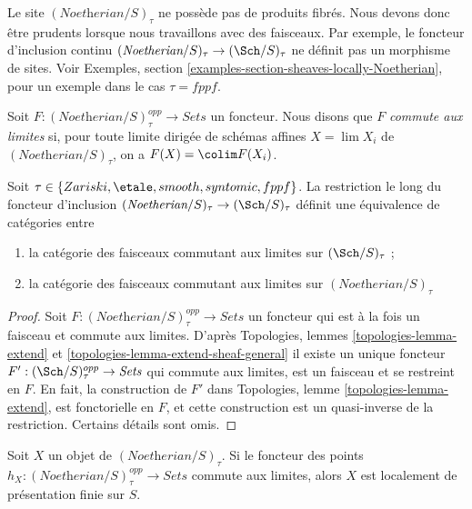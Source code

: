 \begin{remark}[Avertissement]
\label{remark-no-fibre-products}
Le site $(\textit{Noetherian}/S)_\tau$ ne possède pas de produits fibrés.
Nous devons donc être prudents lorsque nous travaillons avec des faisceaux.
Par exemple, le foncteur d'inclusion continu
$(\textit{Noetherian}/S)_\tau \to (\Sch/S)_\tau$
ne définit pas un morphisme de sites. Voir Exemples, section
\ref{examples-section-sheaves-locally-Noetherian}, pour un exemple dans le cas
$\tau = fppf$.
\end{remark}

\noindent
Soit $F : (\textit{Noetherian}/S)_\tau^{opp} \to \textit{Sets}$ un foncteur.
Nous disons que $F$ {\it commute aux limites} si, pour toute limite dirigée de
schémas affines $X = \lim X_i$ de $(\textit{Noetherian}/S)_\tau$, on a
$F(X) = \colim F(X_i)$.

\begin{lemma}
\label{lemma-canonical-extension}
Soit $\tau \in \{Zariski, \etale, smooth, syntomic, fppf\}$. La restriction le
long du foncteur d'inclusion
$(\textit{Noetherian}/S)_\tau \to (\Sch/S)_\tau$
définit une équivalence de catégories entre
\begin{enumerate}
\item la catégorie des faisceaux commutant aux limites sur
$(\Sch/S)_\tau$ ;
\item la catégorie des faisceaux commutant aux limites sur
$(\textit{Noetherian}/S)_\tau$
\end{enumerate}
\end{lemma}

\begin{proof}
Soit $F : (\textit{Noetherian}/S)_\tau^{opp} \to \textit{Sets}$ un foncteur
qui est à la fois un faisceau et commute aux limites. D'après Topologies, lemmes
\ref{topologies-lemma-extend} et \ref{topologies-lemma-extend-sheaf-general}
il existe un unique foncteur
$F' : (\Sch/S)_\tau^{opp} \to \textit{Sets}$
qui commute aux limites, est un faisceau et se restreint en $F$. En fait, la
construction de $F'$ dans Topologies, lemme \ref{topologies-lemma-extend}, est
fonctorielle en $F$, et cette construction est un quasi-inverse de la
restriction. Certains détails sont omis.
\end{proof}

\begin{lemma}
\label{lemma-representable-limit-preserving}
Soit $X$ un objet de $(\textit{Noetherian}/S)_\tau$. Si le foncteur des points
$h_X : (\textit{Noetherian}/S)_\tau^{opp} \to \textit{Sets}$ commute aux
limites, alors $X$ est localement de présentation finie sur $S$.
\end{lemma}

